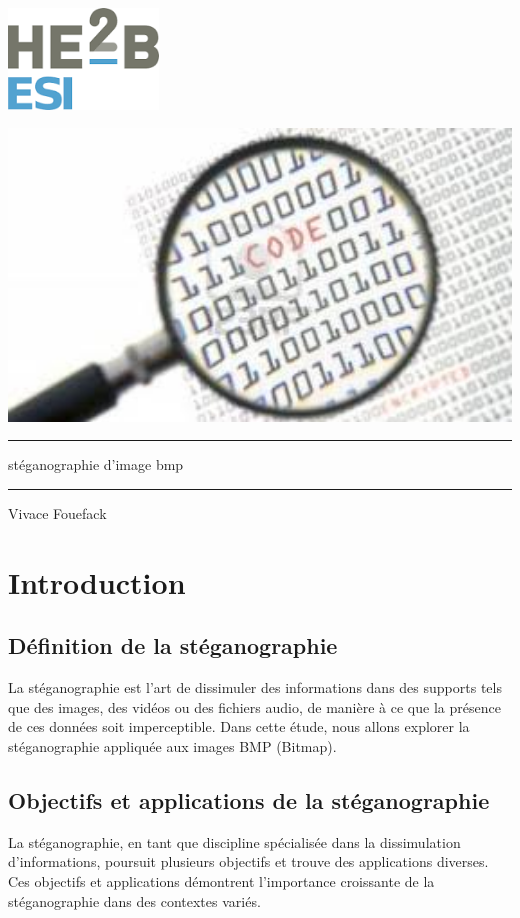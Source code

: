 \documentclass{article}
\begin{document}
\includegraphics[width=0.3\textwidth]{esi.png}
\thispagestyle{empty}
\begin{center}
    \vspace*{3cm}
    \includegraphics[width=1\textwidth]{ste.jpeg}
    \Huge
    \hrule
    \vspace{0.5cm}
    stéganographie d'image bmp
    \vspace{0.5cm}
    \hrule
    \vspace{1cm}
    \Large
    Vivace Fouefack \\

\end{center}
\newpage
\renewcommand{\contentsname}{Table des matières}
\tableofcontents
\newpage
\section{Introduction}

\subsection{Définition de la stéganographie}
La stéganographie est l'art de dissimuler des informations dans des supports tels que des images, des vidéos ou des fichiers audio, de manière à ce que la présence de ces données soit imperceptible. Dans cette étude, nous allons explorer la stéganographie appliquée aux images BMP (Bitmap).
\subsection{Objectifs et applications de la stéganographie}
La stéganographie, en tant que discipline spécialisée dans la dissimulation d'informations, poursuit plusieurs objectifs et trouve des applications diverses. Ces objectifs et applications démontrent l'importance croissante de la stéganographie dans des contextes variés.
\end{document}
